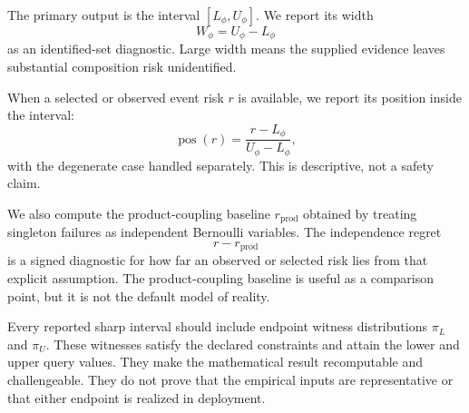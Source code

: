 The primary output is the interval $[L_\phi,U_\phi]$. We report its width
\[
  W_\phi = U_\phi - L_\phi
\]
as an identified-set diagnostic. Large width means the supplied evidence leaves
substantial composition risk unidentified.

When a selected or observed event risk $r$ is available, we report its position
inside the interval:
\[
  \operatorname{pos}(r) = \frac{r-L_\phi}{U_\phi-L_\phi},
\]
with the degenerate case handled separately. This is descriptive, not a safety
claim.

We also compute the product-coupling baseline $r_{\mathrm{prod}}$ obtained by
treating singleton failures as independent Bernoulli variables. The
independence regret
\[
  r-r_{\mathrm{prod}}
\]
is a signed diagnostic for how far an observed or selected risk lies from that
explicit assumption. The product-coupling baseline is useful as a comparison
point, but it is not the default model of reality.

Every reported sharp interval should include endpoint witness distributions
$\pi_L$ and $\pi_U$. These witnesses satisfy the declared constraints and attain
the lower and upper query values. They make the mathematical result
recomputable and challengeable. They do not prove that the empirical inputs are
representative or that either endpoint is realized in deployment.
